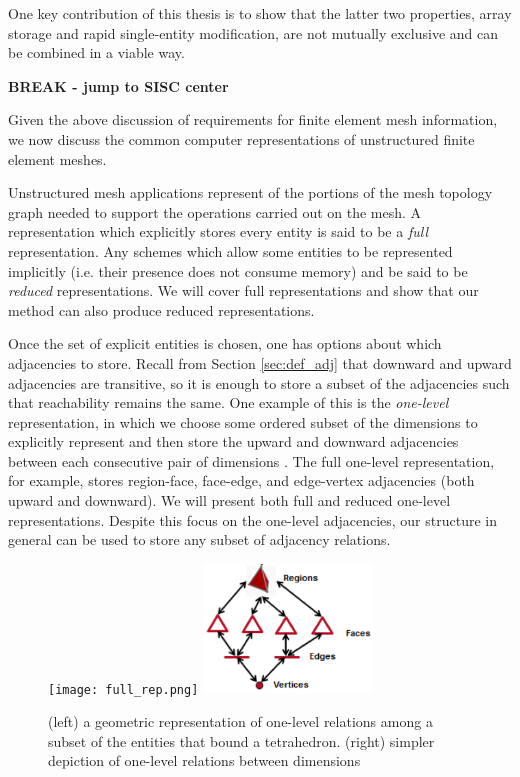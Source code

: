 One key contribution of this thesis is to show that the latter two properties,
array storage and rapid single-entity modification, are not mutually exclusive
and can be combined in a viable way.

{\bf BREAK - jump to SISC center}

Given the above discussion of requirements
for finite element mesh information, we now discuss
the common computer representations of unstructured
finite element meshes.

Unstructured mesh applications represent
of the portions of the mesh topology graph
needed to support the operations carried out on the mesh.
A representation which explicitly stores
every entity is said to be a {\it full}
representation.
Any schemes which allow some entities to be represented
implicitly (i.e. their presence does not consume memory)
and be said to be {\it reduced} representations.
We will cover full representations and show that our method
can also produce reduced representations.

Once the set of explicit entities is chosen, one has
options about which adjacencies to store.
Recall from Section \ref{sec:def_adj} that downward and upward
adjacencies are transitive, so it is enough to
store a subset of the adjacencies such that reachability
remains the same.
One example of this is the {\it one-level} representation,
in which we choose some ordered subset of the dimensions
to explicitly represent and then store the upward
and downward adjacencies between each consecutive
pair of dimensions \cite{beall1997general}.
The full one-level representation, for example, stores
region-face, face-edge, and edge-vertex adjacencies
(both upward and downward).
We will present both full and reduced one-level representations.
Despite this focus on the one-level adjacencies, our structure
in general can be used to store any subset of
adjacency relations.

\begin{figure}
\begin{center}
\texttt{[image: full\_rep.png]}
\includegraphics[width=0.4\textwidth]{one_level.png}
\caption{(left) a geometric representation of one-level
relations among a subset of the entities that bound a tetrahedron.
(right) simpler depiction of one-level relations between dimensions}
\label{fig:topo}
\end{center}
\end{figure}

